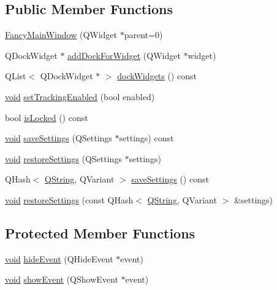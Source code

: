 \subsection*{\-Public \-Member \-Functions}
\begin{DoxyCompactItemize}
\item 
\hyperlink{class_utils_1_1_fancy_main_window_a168e128d3f13bbfaf7805d9cfb590bc2}{\-Fancy\-Main\-Window} (\-Q\-Widget $\ast$parent=0)
\item 
\-Q\-Dock\-Widget $\ast$ \hyperlink{class_utils_1_1_fancy_main_window_a421491059555a87ae2b5c395a4e54c0d}{add\-Dock\-For\-Widget} (\-Q\-Widget $\ast$widget)
\item 
\-Q\-List$<$ \-Q\-Dock\-Widget $\ast$ $>$ \hyperlink{class_utils_1_1_fancy_main_window_aa36813c3a709ff0f7d2eb9a5da76bfd4}{dock\-Widgets} () const 
\item 
\hyperlink{group___u_a_v_objects_plugin_ga444cf2ff3f0ecbe028adce838d373f5c}{void} \hyperlink{class_utils_1_1_fancy_main_window_a2d8d324b8363730282ba40fecb8b9768}{set\-Tracking\-Enabled} (bool enabled)
\item 
bool \hyperlink{class_utils_1_1_fancy_main_window_ac239ffe161e74932b493aa55d23d8b62}{is\-Locked} () const 
\item 
\hyperlink{group___u_a_v_objects_plugin_ga444cf2ff3f0ecbe028adce838d373f5c}{void} \hyperlink{class_utils_1_1_fancy_main_window_ad7909fa8deee5dc4394554ca8acdab18}{save\-Settings} (\-Q\-Settings $\ast$settings) const 
\item 
\hyperlink{group___u_a_v_objects_plugin_ga444cf2ff3f0ecbe028adce838d373f5c}{void} \hyperlink{class_utils_1_1_fancy_main_window_a38517f30e5d3a541aa19eca0a15d1c8b}{restore\-Settings} (\-Q\-Settings $\ast$settings)
\item 
\-Q\-Hash$<$ \hyperlink{group___u_a_v_objects_plugin_gab9d252f49c333c94a72f97ce3105a32d}{\-Q\-String}, \-Q\-Variant $>$ \hyperlink{class_utils_1_1_fancy_main_window_ac5f53bf721cfaeb1339265d28c13a553}{save\-Settings} () const 
\item 
\hyperlink{group___u_a_v_objects_plugin_ga444cf2ff3f0ecbe028adce838d373f5c}{void} \hyperlink{class_utils_1_1_fancy_main_window_a91be3cb4a0f106a24def9f64f29917ef}{restore\-Settings} (const \-Q\-Hash$<$ \hyperlink{group___u_a_v_objects_plugin_gab9d252f49c333c94a72f97ce3105a32d}{\-Q\-String}, \-Q\-Variant $>$ \&settings)
\end{DoxyCompactItemize}
\subsection*{\-Protected \-Member \-Functions}
\begin{DoxyCompactItemize}
\item 
\hyperlink{group___u_a_v_objects_plugin_ga444cf2ff3f0ecbe028adce838d373f5c}{void} \hyperlink{class_utils_1_1_fancy_main_window_af75f017b9f6111029debafa47838a7a9}{hide\-Event} (\-Q\-Hide\-Event $\ast$event)
\item 
\hyperlink{group___u_a_v_objects_plugin_ga444cf2ff3f0ecbe028adce838d373f5c}{void} \hyperlink{class_utils_1_1_fancy_main_window_ae5574599bcaf697abc28fd98ad37def7}{show\-Event} (\-Q\-Show\-Event $\ast$event)
\end{DoxyCompactItemize}


